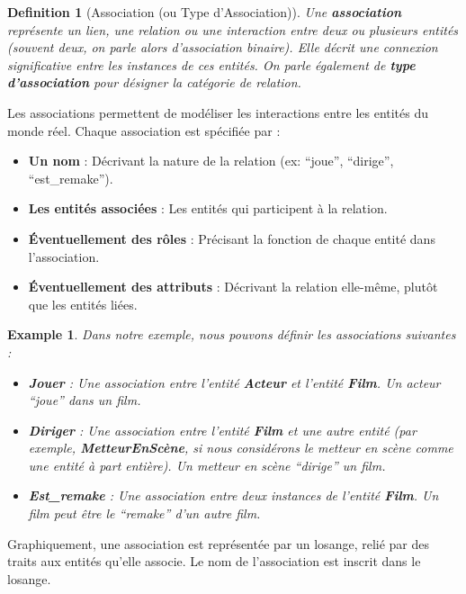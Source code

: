 \documentclass{article}
\newtheorem{definition}{Definition}
\newtheorem{example}{Example}
\begin{document}
\begin{definition}[Association (ou Type d'Association)]
    Une \textbf{association} représente un lien, une relation ou une interaction entre deux ou plusieurs entités (souvent deux, on parle alors d'association binaire). Elle décrit une connexion significative entre les instances de ces entités. On parle également de \textbf{type d'association} pour désigner la catégorie de relation.
\end{definition}

Les associations permettent de modéliser les interactions entre les entités du monde réel. Chaque association est spécifiée par :

\begin{itemize}
    \item \textbf{Un nom} : Décrivant la nature de la relation (ex: ``joue'', ``dirige'', ``est\_remake'').
    \item \textbf{Les entités associées} :  Les entités qui participent à la relation.
    \item \textbf{Éventuellement des rôles} :  Précisant la fonction de chaque entité dans l'association.
    \item \textbf{Éventuellement des attributs} :  Décrivant la relation elle-même, plutôt que les entités liées.
\end{itemize}

\begin{example}
    Dans notre exemple, nous pouvons définir les associations suivantes :

    \begin{itemize}
        \item \textbf{Jouer} :  Une association entre l'entité \textbf{Acteur} et l'entité \textbf{Film}.  Un acteur ``joue'' dans un film.
        \item \textbf{Diriger} : Une association entre l'entité \textbf{Film} et une autre entité (par exemple, \textbf{MetteurEnScène}, si nous considérons le metteur en scène comme une entité à part entière). Un metteur en scène ``dirige'' un film.
        \item \textbf{Est\_remake} :  Une association entre deux instances de l'entité \textbf{Film}. Un film peut être le ``remake'' d'un autre film.
    \end{itemize}
\end{example}

Graphiquement, une association est représentée par un losange, relié par des traits aux entités qu'elle associe. Le nom de l'association est inscrit dans le losange.
\end{document}
